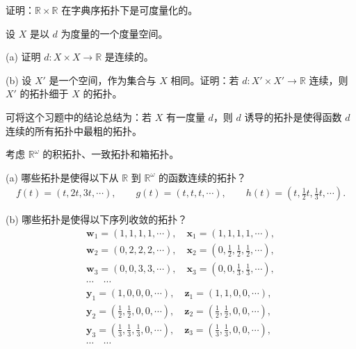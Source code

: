 \documentclass[../../main.tex]{subfiles}
\begin{document}
\begin{exercise}\label{exercise:ch02-度量拓扑-2}
证明：$\mathbb{R} \times \mathbb{R}$ 在字典序拓扑下是可度量化的。
\end{exercise}

\begin{exercise}\label{exercise:ch02-度量拓扑-3}
设 $X$ 是以 $d$ 为度量的一个度量空间。

(a) 证明 $d: X \times X \rightarrow \mathbb{R}$ 是连续的。

(b) 设 $X'$ 是一个空间，作为集合与 $X$ 相同。证明：若 $d: X' \times X' \rightarrow \mathbb{R}$ 连续，则 $X'$ 的拓扑细于 $X$ 的拓扑。

可将这个习题中的结论总结为：若 $X$ 有一度量 $d$，则 $d$ 诱导的拓扑是使得函数 $d$ 连续的所有拓扑中最粗的拓扑。
\end{exercise}

\begin{exercise}\label{exercise:ch02-度量拓扑-4}
考虑 $\mathbb{R}^{\omega}$ 的积拓扑、一致拓扑和箱拓扑。

(a) 哪些拓扑是使得以下从 $\mathbb{R}$ 到 $\mathbb{R}^{\omega}$ 的函数连续的拓扑？
\begin{align*}
f(t) = (t, 2t, 3t, \cdots), \qquad g(t) = (t, t, t, \cdots), \qquad h(t) = \left(t, \frac{1}{2}t, \frac{1}{3}t, \cdots\right).
\end{align*}

(b) 哪些拓扑是使得以下序列收敛的拓扑？
\begin{align*}
\boldsymbol{w}_{1} = (1, 1, 1, 1, \cdots), \quad \boldsymbol{x}_{1} = (1, 1, 1, 1, \cdots), \\
\boldsymbol{w}_{2} = (0, 2, 2, 2, \cdots), \quad \boldsymbol{x}_{2} = \left(0, \frac{1}{2}, \frac{1}{2}, \frac{1}{2}, \cdots\right), \\
\boldsymbol{w}_{3} = (0, 0, 3, 3, \cdots), \quad \boldsymbol{x}_{3} = \left(0, 0, \frac{1}{3}, \frac{1}{3}, \cdots\right), \\
\cdots \quad \cdots \\
\boldsymbol{y}_{1} = (1, 0, 0, 0, \cdots), \quad \boldsymbol{z}_{1} = (1, 1, 0, 0, \cdots), \\
\boldsymbol{y}_{2} = \left(\frac{1}{2}, \frac{1}{2}, 0, 0, \cdots\right), \quad \boldsymbol{z}_{2} = \left(\frac{1}{2}, \frac{1}{2}, 0, 0, \cdots\right), \\
\boldsymbol{y}_{3} = \left(\frac{1}{3}, \frac{1}{3}, \frac{1}{3}, 0, \cdots\right), \quad \boldsymbol{z}_{3} = \left(\frac{1}{3}, \frac{1}{3}, 0, 0, \cdots\right), \\
\cdots \quad \cdots
\end{align*}
\end{exercise}
\end{document}
